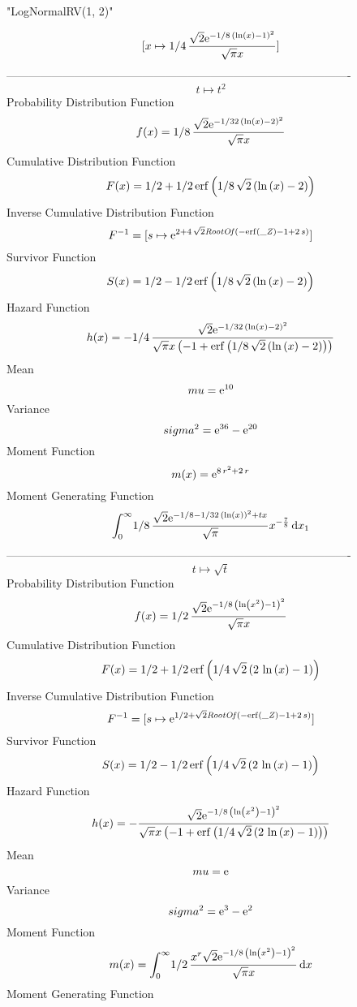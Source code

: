 \documentclass[12pt]{article}
\begin{document}
 
                             "LogNormalRV(1, 2)"

$$[x\mapsto 1/4\,{\frac {\sqrt {2}{{\rm e}^{-1/8\, \left( \ln  \left( x
 \right) -1 \right) ^{2}}}}{\sqrt {\pi}x}}]
$$-------------------------------------------------------------------------------------------  \\$$t\mapsto {t}^{2}
$$Probability Distribution Function 
$$  f(x)=1/8\,{\frac {\sqrt {2}{{\rm e}^{-1/32\, \left( \ln  \left( x \right) -
2 \right) ^{2}}}}{\sqrt {\pi}x}}
$$Cumulative Distribution Function  
 $$F(x)=1/2+1/2\,{\rm erf} \left(1/8\,\sqrt {2} \left( \ln  \left( x \right) -
2 \right) \right)
$$ Inverse Cumulative Distribution Function 
  $$F^{-1} = [s\mapsto {{\rm e}^{2+4\,\sqrt {2}{\it RootOf} \left( -{\rm erf} 
\left({\it \_Z}\right)-1+2\,s \right) }}]
$$Survivor Function 
 $$ S(x)=1/2-1/2\,{\rm erf} \left(1/8\,\sqrt {2} \left( \ln  \left( x \right) -
2 \right) \right)
$$ Hazard Function 
 $$ h(x)=-1/4\,{\frac {\sqrt {2}{{\rm e}^{-1/32\, \left( \ln  \left( x \right) 
-2 \right) ^{2}}}}{\sqrt {\pi}x \left( -1+{\rm erf} \left(1/8\,\sqrt {
2} \left( \ln  \left( x \right) -2 \right) \right) \right) }}
$$Mean 
 $$ mu={{\rm e}^{10}}
$$ Variance 
 $$ sigma^2 = {{\rm e}^{36}}-{{\rm e}^{20}}
$$Moment Function 
 $$ m(x) = {{\rm e}^{8\,{r}^{2}+2\,r}}
$$ Moment Generating Function 
 $$\int_{0}^{\infty }\!1/8\,{\frac {\sqrt {2}{{\rm e}^{-1/8-1/32\,
 \left( \ln  \left( x \right)  \right) ^{2}+tx}}}{\sqrt {\pi}}{x}^{-{
\frac{7}{8}}}}\,{\rm d}x_{{1}}
$$-------------------------------------------------------------------------------------------  \\$$t\mapsto \sqrt {t}
$$Probability Distribution Function 
$$  f(x)=1/2\,{\frac {\sqrt {2}{{\rm e}^{-1/8\, \left( \ln  \left( {x}^{2}
 \right) -1 \right) ^{2}}}}{\sqrt {\pi}x}}
$$Cumulative Distribution Function  
 $$F(x)=1/2+1/2\,{\rm erf} \left(1/4\,\sqrt {2} \left( 2\,\ln  \left( x
 \right) -1 \right) \right)
$$ Inverse Cumulative Distribution Function 
  $$F^{-1} = [s\mapsto {{\rm e}^{1/2+\sqrt {2}{\it RootOf} \left( -{\rm erf} \left(
{\it \_Z}\right)-1+2\,s \right) }}]
$$Survivor Function 
 $$ S(x)=1/2-1/2\,{\rm erf} \left(1/4\,\sqrt {2} \left( 2\,\ln  \left( x
 \right) -1 \right) \right)
$$ Hazard Function 
 $$ h(x)=-{\frac {\sqrt {2}{{\rm e}^{-1/8\, \left( \ln  \left( {x}^{2} \right) 
-1 \right) ^{2}}}}{\sqrt {\pi}x \left( -1+{\rm erf} \left(1/4\,\sqrt {
2} \left( 2\,\ln  \left( x \right) -1 \right) \right) \right) }}
$$Mean 
 $$ mu={\rm e}
$$ Variance 
 $$ sigma^2 = {{\rm e}^{3}}-{{\rm e}^{2}}
$$Moment Function 
 $$ m(x) = \int_{0}^{\infty }\!1/2\,{\frac {{x}^{r}\sqrt {2}{{\rm e}^{-1/8\,
 \left( \ln  \left( {x}^{2} \right) -1 \right) ^{2}}}}{\sqrt {\pi}x}}
\,{\rm d}x
$$ Moment Generating Function 
\end{document}

